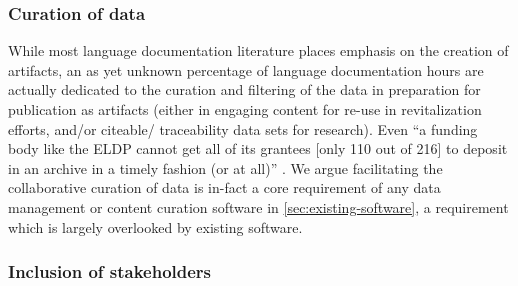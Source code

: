 \documentclass[11pt]{article}
\begin{document}

\subsubsection{Curation of data}


While most language documentation literature places emphasis on the creation of artifacts, an as yet unknown percentage of language documentation hours are actually dedicated to the curation and filtering of the data in preparation for publication as artifacts (either in engaging content for re-use in revitalization efforts, and/or citeable/ traceability data sets for research). Even ``a funding body like the ELDP cannot get all of its grantees [only 110 out of 216] to deposit in an archive in a timely fashion (or at all)'' \cite{Thieberger:2012}. We argue facilitating the collaborative curation of data is in-fact a core requirement of any data management or content curation software in \autoref{sec:existing-software}, a requirement which is largely overlooked by existing software.



 
\subsubsection{Inclusion of stakeholders}
\end{document}
